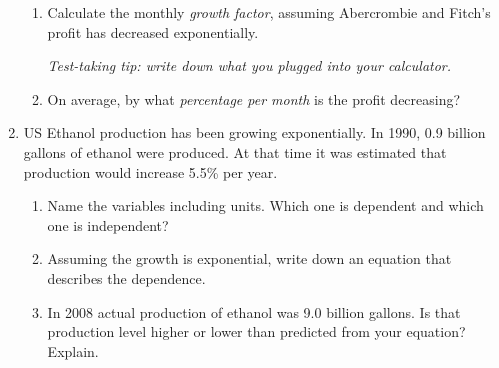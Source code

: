 \documentclass[12pt]{article}
\begin{document}
\begin{enumerate}
\begin{enumerate}
\item Calculate the monthly \textit{growth factor}, assuming Abercrombie and Fitch's profit has decreased exponentially.

\emph{Test-taking tip:  write down what you plugged into your calculator.}
\vfill
\vfill
\item On average, by what \textit{percentage per month} is the profit decreasing?
\vfill
\end{enumerate}
\hrulefill



\item US Ethanol production has been growing exponentially. In 1990, 0.9 billion gallons of ethanol were produced.  At that time it was estimated that production would increase 5.5\% per year.

\begin{enumerate}
\item Name the variables including units.  Which one is dependent and which one is independent?
\vfill
\item Assuming the growth is exponential, write down an equation that describes the dependence.
\vfill
\item In 2008 actual production of ethanol was 9.0 billion gallons.  Is that production level higher or lower than predicted from your equation?  Explain.
\vfill
\end{enumerate}

\end{enumerate}
\end{document}
